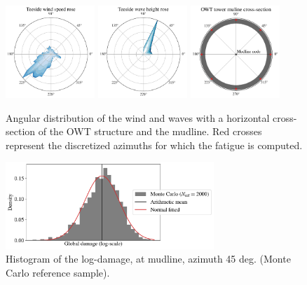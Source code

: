 \begin{figure}[!h]
\begin{center}
    \includegraphics[width=0.3\textwidth]{part2/figures/DCE/teesside/teeside_wind_rose.pdf} \quad
    \includegraphics[width=0.3\textwidth]{part2/figures/DCE/teesside/teeside_wave_rose.pdf} \quad
    \includegraphics[width=0.3\textwidth]{part2/figures/DCE/teesside/mudline_crossection.pdf}
\end{center}
\caption{Angular distribution of the wind and waves with a horizontal cross-section of the OWT structure and the mudline. 
Red crosses represent the discretized azimuths for which the fatigue is computed.}
\label{fig:wind_wave_roses}
\end{figure}

\begin{figure}[!h]
\begin{center}
    \includegraphics[width=0.7\textwidth]{part2/figures/DCE/teesside/reference_log_histogramNode1_45.pdf}
\end{center}
\caption{Histogram of the log-damage, at mudline, azimuth 45 deg. (Monte Carlo reference sample).}
\label{fig:histo_mc}
\end{figure}

